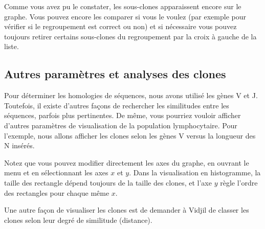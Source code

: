 \documentclass[10pt]{article}
\begin{document}
Comme vous avez pu le constater, les sous-clones apparaissent encore sur
le graphe. Vous pouvez encore les comparer si vous le voulez (par
exemple pour vérifier si le regroupement est correct ou non) et si nécessaire
vous pouvez toujours retirer certains sous-clones du regroupement par la croix
à gauche de la liste.






\subsection{Autres paramètres et analyses des clones}

Pour déterminer les homologies de séquences, nous avons utilisé
les gènes V et J. Toutefois, il existe d'autres façons de
rechercher les similitudes entre les séquences, parfois plus
pertinentes. De même, vous pourriez vouloir afficher d'autres paramètres
de visualisation de la population lymphocytaire. Pour l'exemple, nous
allons afficher les clones selon les gènes V versus la longueur
des N insérés.


Notez que vous pouvez modifier directement les axes du graphe, en ouvrant le
menu  et en sélectionnant les axes $x$ et $y$.
Dans la visualisation en histogramme, la taille des
rectangle dépend toujours de la taille des clones, et l'axe $y$ règle l'ordre
des rectangles pour chaque même $x$.


Une autre façon de visualiser les clones est de demander à Vidjil de
classer les clones selon leur degré de similitude (distance).
\end{document}
